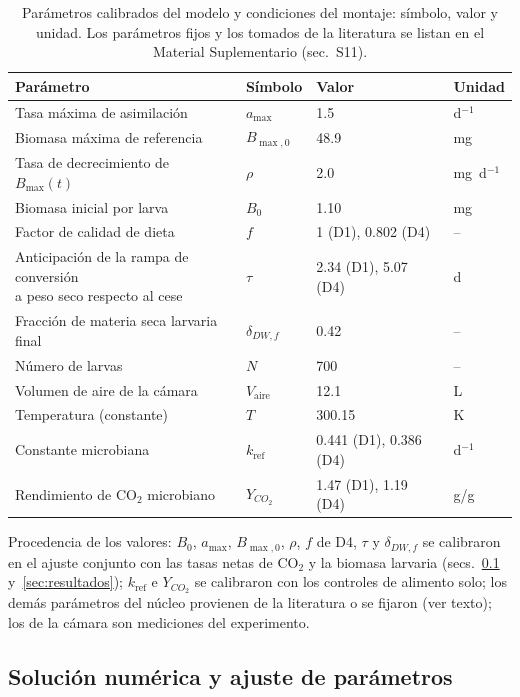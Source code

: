 \begin{table}[htbp]
\centering
\caption{Parámetros calibrados del modelo y condiciones del montaje: símbolo, valor y unidad. Los parámetros fijos y los tomados de la literatura se listan en el Material Suplementario (sec.~S11).}
\label{tab:parametros}
\begin{tabular}{llll}
\toprule
Parámetro & Símbolo & Valor & Unidad \\
\midrule
Tasa máxima de asimilación & $a_{\max}$ & 1.5 & d$^{-1}$ \\
Biomasa máxima de referencia & $B_{\max,0}$ & 48.9 & mg \\
Tasa de decrecimiento de $B_{\max}(t)$ & $\rho$ & 2.0 & mg~d$^{-1}$ \\
Biomasa inicial por larva & $B_0$ & 1.10 & mg \\
Factor de calidad de dieta & $f$ & 1 (D1), 0.802 (D4) & -- \\
\shortstack[l]{Anticipación de la rampa de conversión\\ a peso seco respecto al cese} & $\tau$ & 2.34 (D1), 5.07 (D4) & d \\
Fracción de materia seca larvaria final & $\delta_{DW,f}$ & 0.42 & -- \\
Número de larvas & $N$ & 700 & -- \\
Volumen de aire de la cámara & $V_{\mathrm{aire}}$ & 12.1 & L \\
Temperatura (constante) & $T$ & 300.15 & K \\
Constante microbiana & $k_{\mathrm{ref}}$ & 0.441 (D1), 0.386 (D4) & d$^{-1}$ \\
Rendimiento de CO$_2$ microbiano & $Y_{CO_2}$ & 1.47 (D1), 1.19 (D4) & g/g \\
\bottomrule
\end{tabular}
\end{table}

\noindent Procedencia de los valores: $B_0$, $a_{\max}$, $B_{\max,0}$, $\rho$, $f$ de D4, $\tau$ y $\delta_{DW,f}$ se calibraron en el ajuste conjunto con las tasas netas de CO$_2$ y la biomasa larvaria (secs.~\ref{sec:numerica} y~\ref{sec:resultados}); $k_{\mathrm{ref}}$ e $Y_{CO_2}$ se calibraron con los controles de alimento solo; los demás parámetros del núcleo provienen de la literatura o se fijaron (ver texto); los de la cámara son mediciones del experimento.

\subsection{Solución numérica y ajuste de parámetros}
\label{sec:numerica}

